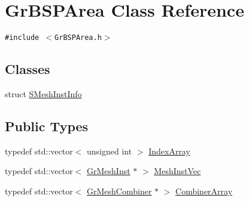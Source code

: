 \hypertarget{class_gr_b_s_p_area}{
\section{GrBSPArea Class Reference}
\label{class_gr_b_s_p_area}
}
{\tt \#include $<$GrBSPArea.h$>$}

\subsection*{Classes}
\begin{CompactItemize}
\item 
struct \hyperlink{struct_gr_b_s_p_area_1_1_s_mesh_inst_info}{SMeshInstInfo}
\end{CompactItemize}
\subsection*{Public Types}
\begin{CompactItemize}
\item 
typedef std::vector$<$ unsigned int $>$ \hyperlink{class_gr_b_s_p_area_71a5e7cae58da5ccbce3662b378784ec}{IndexArray}
\item 
typedef std::vector$<$ \hyperlink{class_gr_mesh_inst}{GrMeshInst} $\ast$ $>$ \hyperlink{class_gr_b_s_p_area_ca3e4c6211c02064ec2d70b4f61738a8}{MeshInstVec}
\item 
typedef std::vector$<$ \hyperlink{class_gr_mesh_combiner}{GrMeshCombiner} $\ast$ $>$ \hyperlink{class_gr_b_s_p_area_31bece0da485709ff48572c457c2a3f4}{CombinerArray}
\end{CompactItemize}
